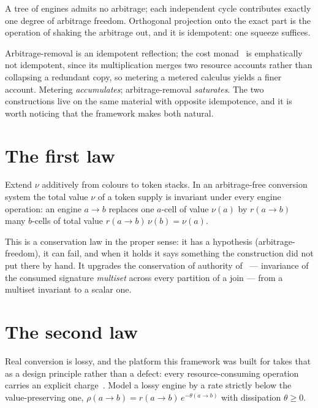 A tree of engines admits no arbitrage; each independent cycle contributes
exactly one degree of arbitrage freedom.  Orthogonal projection onto the
exact part is the operation of shaking the arbitrage out, and it is
idempotent: one squeeze suffices.

\begin{remark}
\label{rmk:twomonads}
Arbitrage-removal is an idempotent reflection; the cost
monad~\cite[\S9]{CE} is emphatically not idempotent, since its
multiplication merges two resource accounts rather than collapsing a
redundant copy, so metering a metered calculus yields a finer account.
Metering \emph{accumulates}; arbitrage-removal \emph{saturates}.  The two
constructions live on the same material with opposite idempotence, and it
is worth noticing that the framework makes both natural.
\end{remark}

\section{The first law}

\begin{proposition}
\label{prop:firstlaw}
Extend $\nu$ additively from colours to token stacks.  In an
arbitrage-free conversion system the total value $\nu$ of a token supply
is invariant under every engine operation: an engine $a \to b$ replaces
one $a$-cell of value $\nu(a)$ by $r(a\to b)$ many $b$-cells of total
value $r(a\to b)\,\nu(b) = \nu(a)$.
\end{proposition}

This is a conservation law in the proper sense: it has a hypothesis
(arbitrage-freedom), it can fail, and when it holds it says something the
construction did not put there by hand.  It upgrades the conservation of
authority of~\cite[Prop.~4.7]{CARho} --- invariance of the consumed
signature \emph{multiset} across every partition of a join --- from a
multiset invariant to a scalar one.

\section{The second law}

Real conversion is lossy, and the platform this framework was built for
takes that as a design principle rather than a defect: every
resource-consuming operation carries an explicit charge~\cite{CARho}.
Model a lossy engine by a rate strictly below the value-preserving one,
$\rho(a\to b) = r(a\to b)\,e^{-\theta(a\to b)}$ with dissipation
$\theta \geq 0$.

